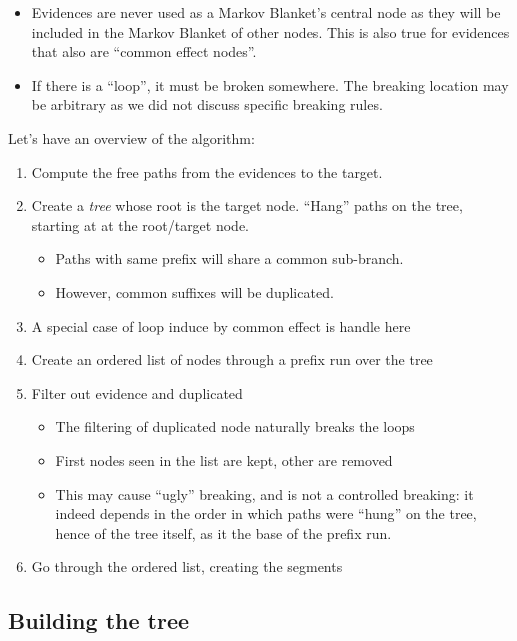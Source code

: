 \documentclass[a4paper]{article}
\newcommand*{\say}[1]{``{#1}''}
\begin{document}
\begin{itemize}
  \item Evidences are never used as a Markov Blanket's central node as they will be included in the Markov Blanket
    of other nodes. This is also true for evidences that also are \say{common effect nodes}.
  \item If there is a \say{loop}, it must be broken somewhere. The breaking location may be arbitrary as we did not
    discuss specific breaking rules.
\end{itemize}

Let's have an overview of the algorithm:
\begin{enumerate}
  \item Compute the free paths from the evidences to the target.
  \item Create a \emph{tree} whose root is the target node.
    \say{Hang} paths on the tree, starting at at the root/target node.
    \begin{itemize}
      \item Paths with same prefix will share a common sub-branch.
      \item However, common suffixes will be duplicated.
    \end{itemize}
  \item A special case of loop induce by common effect is handle here
  \item Create an ordered list of nodes through a prefix run over the tree
  \item Filter out evidence and duplicated
    \begin{itemize}
      \item The filtering of duplicated node naturally breaks the loops
      \item First nodes seen in the list are kept, other are removed
      \item This may cause \say{ugly} breaking, and is not a controlled breaking:
        it indeed depends in the order in which paths were \say{hung} on the tree, hence of the tree itself,
        as it the base of the prefix run.
    \end{itemize}
  \item Go through the ordered list, creating the segments
\end{enumerate}

\subsection{Building the tree}
\end{document}
